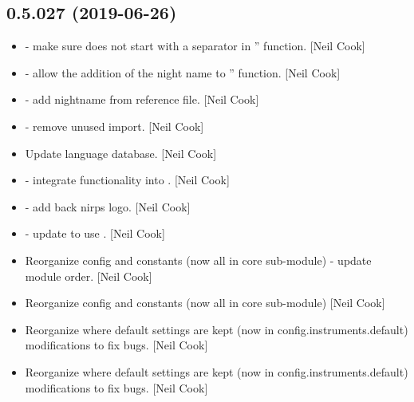 \documentclass[a4paper,10pt,english]{report}
\begin{document}
\subsection{0.5.027 (2019-06-26)}
\label{\detokenize{misc/changelog:id109}}\begin{itemize}
\item {} 
 - make sure  does not start with a separator in
” function. {[}Neil Cook{]}

\item {} 
 - allow the addition of the night name to ”
function. {[}Neil Cook{]}

\item {} 
 - add nightname from reference file. {[}Neil
Cook{]}

\item {} 
 - remove unused import. {[}Neil Cook{]}

\item {} 
Update language database. {[}Neil Cook{]}

\item {} 
 - integrate  functionality into .
{[}Neil Cook{]}

\item {} 
 - add back nirps logo. {[}Neil Cook{]}

\item {} 
 - update  to use . {[}Neil
Cook{]}

\item {} 
Reorganize config and constants (now all in core sub-module) - update
module order. {[}Neil Cook{]}

\item {} 
Reorganize config and constants (now all in core sub-module) {[}Neil
Cook{]}

\item {} 
Reorganize where default settings are kept (now in
config.instruments.default) \textendash{} modifications to fix bugs. {[}Neil Cook{]}

\item {} 
Reorganize where default settings are kept (now in
config.instruments.default) \textendash{} modifications to fix bugs. {[}Neil Cook{]}


\end{itemize}
\end{document}
